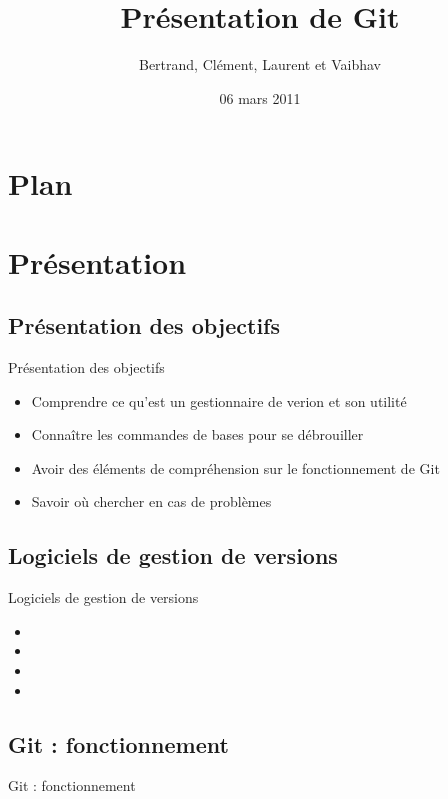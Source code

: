 \documentclass{beamer}
\title[ROSE]{Présentation de Git}
\author{Bertrand, Clément, Laurent et Vaibhav}
\institute{Télécom Paristech}
\date{06 mars 2011}
\begin{document}
\begin{frame}
  \titlepage
\end{frame}

\section*{Plan}
%

\section{Présentation}
\subsection*{Présentation des objectifs}
\begin{frame}{Présentation des objectifs}
  \begin{itemize}
  \item Comprendre ce qu'est un gestionnaire de verion et son utilité
  \item Connaître les commandes de bases pour se débrouiller
  \item Avoir des éléments de compréhension sur le fonctionnement de Git
  \item Savoir où chercher en cas de problèmes
  \end{itemize}
\end{frame}

\subsection*{Logiciels de gestion de versions}
\begin{frame}{Logiciels de gestion de versions}
  \begin{itemize}
  \item 
  \item 
  \item 
  \item 
  \end{itemize}
\end{frame}

\subsection*{Git : fonctionnement}
\begin{frame}{Git : fonctionnement}
\end{frame}
\end{document}
